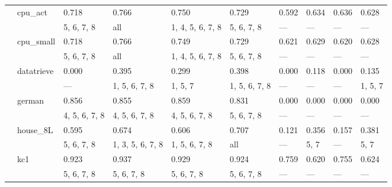 \documentclass{article}
\begin{document}
\begin{center}
\begin{longtable}{p{1.2cm}p{1.8cm}p{1cm}p{1cm}p{1cm}p{1cm}p{1cm}p{1cm}p{1cm}p{1cm}}
             & cpu\_act      & 0.718         & 0.766            & 0.750            & 0.729            & 0.592            & 0.634            & 0.636            & 0.628            \\
             &              & 5, 6, 7, 8    & all              & 1, 4, 5, 6, 7, 8 & 5, 6, 7, 8       & ---              & ---              & ---              & ---              \\
             & cpu\_small    & 0.718         & 0.766            & 0.749            & 0.729            & 0.621            & 0.629            & 0.620            & 0.628            \\
             &              & 5, 6, 7, 8    & all              & 1, 4, 5, 6, 7, 8 & 5, 6, 7, 8       & ---              & ---              & ---              & ---              \\
             & datatrieve   & 0.000         & 0.395            & 0.299            & 0.398            & 0.000            & 0.118            & 0.000            & 0.135            \\
             &              & ---           & 1, 5, 6, 7, 8    & 1, 5, 7          & 1, 5, 6, 7, 8    & ---              & ---              & ---              & 1, 5, 7          \\
             & german       & 0.856         & 0.855            & 0.859            & 0.831            & 0.000            & 0.000            & 0.000            & 0.000            \\
             &              & 4, 5, 6, 7, 8 & 4, 5, 6, 7, 8    & 4, 5, 6, 7, 8    & 5, 6, 7, 8       & ---              & ---              & ---              & ---              \\
             & house\_8L     & 0.595         & 0.674            & 0.606            & 0.707            & 0.121            & 0.356            & 0.157            & 0.381            \\
             &              & 5, 6, 7, 8    & 1, 3, 5, 6, 7, 8 & 1, 5, 6, 7, 8    & all              & ---              & 5, 7             & ---              & 5, 7             \\
             & kc1          & 0.923         & 0.937            & 0.929            & 0.924            & 0.759            & 0.620            & 0.755            & 0.624            \\
             &              & 5, 6, 7, 8    & 5, 6, 7, 8       & 5, 6, 7, 8       & 5, 6, 7, 8       & ---              & ---              & ---              & ---              \\

\end{longtable}
\end{center}
\end{document}
